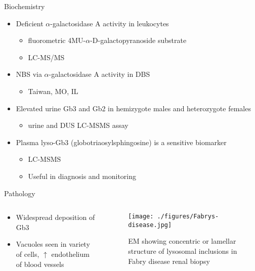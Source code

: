 \documentclass[presentation, smaller]{beamer}
\begin{document}
\begin{frame}[label={sec:orgheadline16}]{Biochemistry}
\begin{itemize}
\item Deficient \(\alpha\)-galactosidase A activity in leukocytes
\begin{itemize}
\item fluorometric 4MU-\(\alpha\)-D-galactopyranoside substrate
\item LC-MS/MS
\end{itemize}
\item NBS via \(\alpha\)-galactosidase A activity in DBS
\begin{itemize}
\item Taiwan, MO, IL
\end{itemize}
\item Elevated urine Gb3 and Gb2 in hemizygote males and heterozygote females
\begin{itemize}
\item urine and DUS LC-MSMS assay
\end{itemize}
\item Plasma lyso-Gb3 (globotriaosylsphingosine) is a sensitive biomarker
\begin{itemize}
\item LC-MSMS
\item Useful in diagnosis and monitoring
\end{itemize}
\end{itemize}
\end{frame}

\begin{frame}[label={sec:orgheadline17}]{Pathology}
\begin{columns}
\begin{column}{0.5\columnwidth}
\begin{itemize}
\item Widespread deposition of Gb3
\item Vacuoles seen in variety of cells, \(\uparrow\) endothelium of blood vessels
\end{itemize}
\end{column}

\begin{column}{0.5\columnwidth}
\begin{figure}[htb]
\centering
\texttt{[image: ./figures/Fabrys-disease.jpg]}
\caption[em]{\label{fig:biopsy}
EM showing concentric or lamellar structure of lysosomal inclusions in Fabry disease renal biopsy}
\end{figure}
\end{column}
\end{columns}
\end{frame}
\end{document}
